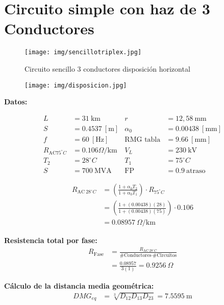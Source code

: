 \section{Circuito simple con haz de 3 Conductores}

\begin{figure}[h!]
    \centering
    \texttt{[image: img/sencillotriplex.jpg]}
    \caption{Circuito sencillo 3 conductores disposición horizontal}
    \label{fig:enter-label}
\end{figure}

\begin{figure}[h!]
    \centering
    \texttt{[image: img/disposicion.jpg]}
    \caption{}
    \label{fig:enter-label2}
\end{figure}
\textbf{Datos:}

\begin{align*}
L &= 31~\text{km} & r &= 12,58~\text{mm} \\
S &= 0.4537~[\text{m}] & \alpha_0 &= 0.00438~[\text{mm}] \\
f &= 60~[\text{Hz}] & \text{RMG tabla} &= 9.66~[\text{mm}] \\
R_{\text{AC}75^\circ C} &= 0.106\Omega/\text{km} & V_L &= 230~\text{kV} \\
T_2 &= 28^\circ C & T_1 &= 75^\circ C \\
S &= 700~\text{MVA} & \text{FP} &= 0.9~\text{atraso}
\end{align*}

\begin{align*}
R_{\text{AC}~28^\circ C} &= \left( \frac{1 + \alpha_0 T_2}{1 + \alpha_0 T_1} \right) \cdot R_{\text{75}^\circ C} \\
&= \left( \frac{1 + (0.00438)(28)}{1 + (0.00438)(75)} \right) \cdot 0.106 \\
&= 0.08957~\Omega/\text{km}
\end{align*}

\textbf{Resistencia total por fase:}
\begin{align*}
R_{\text{Fase}} &= \frac{R_{\text{AC}~28^\circ C}}{\text{\#Conductores} \cdot \text{\#Circuitos}} \\
&= \frac{0.08957}{3(1)} = 0.9256~\Omega
\end{align*}

\textbf{Cálculo de la distancia media geométrica:}
\begin{align*}
DMG_{eq} &= \sqrt[3]{D_{12} D_{13} D_{23}} = 7.5595~\text{m}
\end{align*}

